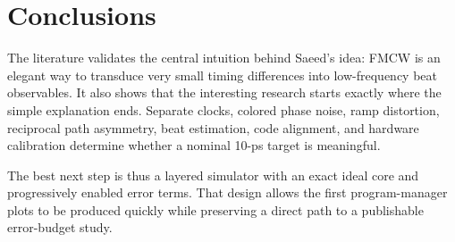 \documentclass[11pt]{article}
\begin{document}
\section{Conclusions}
The literature validates the central intuition behind Saeed's idea: FMCW is an elegant way to transduce very small timing differences into low-frequency beat observables. It also shows that the interesting research starts exactly where the simple explanation ends. Separate clocks, colored phase noise, ramp distortion, reciprocal path asymmetry, beat estimation, code alignment, and hardware calibration determine whether a nominal 10-ps target is meaningful.

The best next step is thus a layered simulator with an exact ideal core and progressively enabled error terms. That design allows the first program-manager plots to be produced quickly while preserving a direct path to a publishable error-budget study.

\clearpage
\end{document}
